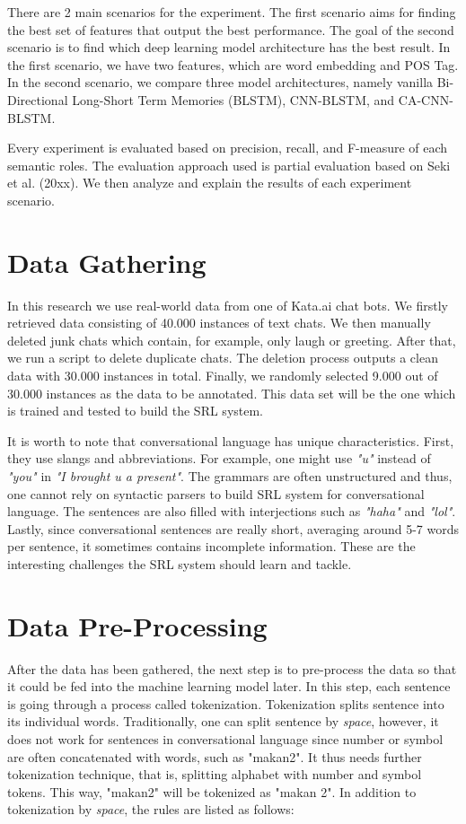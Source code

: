 There are 2 main scenarios for the experiment. The first scenario aims for finding the best set of features that output the best performance. The goal of the second scenario is to find which deep learning model architecture has the best result. In the first scenario, we have two features, which are word embedding and POS Tag. In the second scenario, we compare three model architectures, namely vanilla Bi-Directional Long-Short Term Memories (BLSTM), CNN-BLSTM, and CA-CNN-BLSTM.

Every experiment is evaluated based on precision, recall, and F-measure of each semantic roles. The evaluation approach used is partial evaluation based on Seki et al. (20xx). We then analyze and explain the results of each experiment scenario.

\section{Data Gathering}
In this research we use real-world data from one of Kata.ai chat bots. We firstly retrieved data consisting of 40.000 instances of text chats. We then manually deleted junk chats which contain, for example, only laugh or greeting. After that, we run a script to delete duplicate chats. The deletion process outputs a clean data with 30.000 instances in total. Finally, we randomly selected 9.000 out of 30.000 instances as the data to be annotated. This data set will be the one which is trained and tested to build the SRL system.

It is worth to note that conversational language has unique characteristics. First, they use slangs and abbreviations. For example, one might use \textit{"u"} instead of \textit{"you"} in \textit{"I brought u a present"}. The grammars are often unstructured and thus, one cannot rely on syntactic parsers to build SRL system for conversational language. The sentences are also filled with interjections such as \textit{"haha"} and \textit{"lol"}. Lastly, since conversational sentences are really short, averaging around 5-7 words per sentence, it sometimes contains incomplete information. These are the interesting challenges the SRL system should learn and tackle.

\section{Data Pre-Processing}
After the data has been gathered, the next step is to pre-process the data so that it could be fed into the machine learning model later. In this step, each sentence is going through a process called tokenization. Tokenization splits sentence into its individual words. Traditionally, one can split sentence by \textit{space}, however, it does not work for sentences in conversational language since number or symbol are often concatenated with words, such as "makan2". It thus needs further tokenization technique, that is, splitting alphabet with number and symbol tokens. This way, "makan2" will be tokenized as "makan 2". In addition to tokenization by \textit{space}, the rules are listed as follows:

